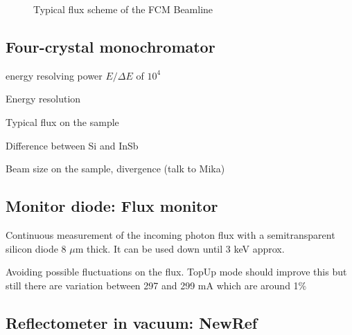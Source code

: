 \begin{figure}%
	\centering
		\caption{Typical flux scheme of the FCM Beamline}
		\label{fig:FCMBeamlineFlux}
\end{figure}

\subsection{Four-crystal monochromator}

energy resolving power \( E/\Delta E \) of \( 10^4 \)

Energy resolution

Typical flux on the sample

Difference between Si and InSb

Beam size on the sample, divergence (talk to Mika)

\subsection{Monitor diode: Flux monitor}

Continuous measurement of the incoming photon flux with a semitransparent silicon diode 8 $\mu$m thick. It can be used down until 3 keV approx.

Avoiding possible fluctuations on the flux. TopUp mode should improve this but still there are variation between 297 and 299 mA which are around 1$\%$

\subsection{Reflectometer in vacuum: NewRef}

